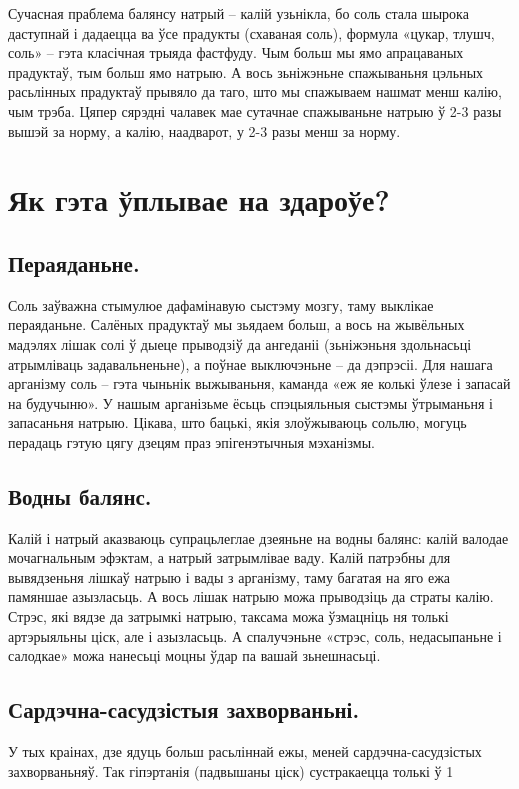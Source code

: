Сучасная праблема балянсу натрый – калій узьнікла, бо соль стала шырока даступнай і дадаецца ва ўсе прадукты (схаваная соль), формула «цукар, тлушч, соль» – гэта класічная трыяда фастфуду. Чым больш мы ямо апрацаваных прадуктаў, тым больш ямо натрыю. А вось зьніжэньне спажываньня цэльных расьлінных прадуктаў прывяло да таго, што мы спажываем нашмат менш калію, чым трэба. Цяпер сярэдні чалавек мае сутачнае спажываньне натрыю ў 2-3 разы вышэй за норму, а калію, наадварот, у 2-3 разы менш за норму.

\section{Як гэта ўплывае на здароўе?}

\subsection{Пераяданьне.}
Соль заўважна стымулюе дафамінавую сыстэму мозгу, таму выклікае пераяданьне. Салёных прадуктаў мы зьядаем больш, а вось на жывёльных мадэлях лішак солі ў дыеце прыводзіў да ангеданіі (зьніжэньня здольнасьці атрымліваць задавальненьне), а поўнае выключэньне – да дэпрэсіі. Для нашага арганізму соль – гэта чыньнік выжываньня, каманда «еж яе колькі ўлезе і запасай на будучыню». У нашым арганізьме ёсьць спэцыяльныя сыстэмы ўтрыманьня і запасаньня натрыю. Цікава, што бацькі, якія злоўжываюць сольлю, могуць перадаць гэтую цягу дзецям праз эпігенэтычныя мэханізмы.

\subsection{Водны балянс.}
Калій і натрый аказваюць супрацьлеглае дзеяньне на водны балянс: калій валодае мочагнальным эфэктам, а натрый затрымлівае ваду. Калій патрэбны для вывядзеньня лішкаў натрыю і вады з арганізму, таму багатая на яго ежа памяншае азызласьць. А вось лішак натрыю можа прыводзіць да страты калію. Стрэс, які вядзе да затрымкі натрыю, таксама можа ўзмацніць ня толькі артэрыяльны ціск, але і азызласьць. А спалучэньне «стрэс, соль, недасыпаньне і салодкае» можа нанесьці моцны ўдар па вашай зьнешнасьці.

\subsection{Сардэчна-сасудзістыя захворваньні.}
У тых краінах, дзе ядуць больш расьліннай ежы, меней сардэчна-сасудзістых захворваньняў. Так гіпэртанія (падвышаны ціск) сустракаецца толькі ў 1%


